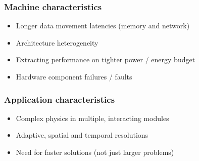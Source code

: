\begin{frame}[fragile]
  \frametitle{Machine characteristics}
  \begin{itemize}
  \item Longer data movement latencies (memory and network)
  \item Architecture heterogeneity
  \item Extracting performance on tighter power / energy budget
  \item Hardware component failures / faults
  \end{itemize}
\end{frame}

\begin{frame}[fragile]
  \frametitle{Application characteristics}
  \begin{itemize}
  \item Complex physics in multiple, interacting modules
  \item Adaptive, spatial and temporal resolutions
  \item Need for faster solutions (not just larger problems)
  \end{itemize}
\end{frame}